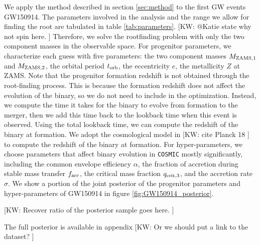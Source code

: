 \documentclass[twocolumn]{aastex631}
\newcommand{\kw}[1]{{\color{rb4}[KW: #1 ]}}
\begin{document}
We apply the method described in section \ref{sec:method} to the first GW events GW150914.
The parameters involved in the analysis and the range we allow for finding the root are tabulated in table \ref{tab:parameters}.
\kw{@Katie state why not spin here.}
Therefore, we solve the rootfinding problem with only the two component masses in the observable space.
For progenitor parameters, we characterize each guess with five parameters: the two component masses $M_{\rm ZAMS,1}$ and $M_{\rm ZAMS,2}$, the orbital period $t_{\rm orb}$, the eccentricity $e$, the metallicity $Z$ at ZAMS.
Note that the progenitor formation redshift is not obtained through the root-finding process.
This is because the formation redshift does not affect the evolution of the binary, so we do not need to include in the optimization.
Instead, we compute the time it takes for the binary to evolve from formation to the merger, then we add this time back to the lookback time when this event is observed.
Using the total lookback time, we can compute the redshift of the binary at formation.
We adopt the cosmological model in \kw{cite Planck 18} to compute the redshift of the binary at formation.
For hyper-parameters, we choose parameters that affect binary evolution in \texttt{COSMIC} mostly significantly, including the common envelope efficiency $\alpha$, the fraction of accretion during stable mass transfer $f_{\rm acc}$, the critical mass fraction $q_{\rm crit,3}$, and the accretion rate $\sigma$.
We show a portion of the joint posterior of the progenitor parameters and hyper-parameters of GW150914 in figure \ref{fig:GW150914_posterior}.

\kw{Recover ratio of the posterior sample goes here.}

The full posterior is available in appendix \kw{Or we should put a link to the dataset?}
\end{document}
